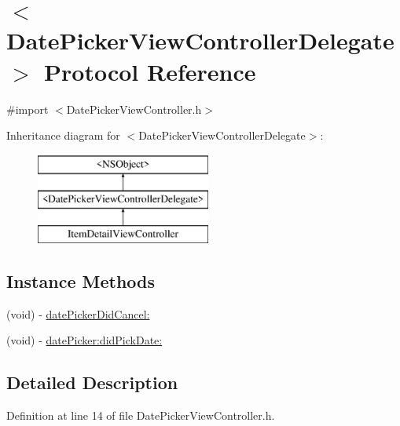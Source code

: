 \hypertarget{protocol_date_picker_view_controller_delegate-p}{\section{$<$Date\-Picker\-View\-Controller\-Delegate$>$ Protocol Reference}
\label{protocol_date_picker_view_controller_delegate-p}
}


{\ttfamily \#import $<$Date\-Picker\-View\-Controller.\-h$>$}

Inheritance diagram for $<$Date\-Picker\-View\-Controller\-Delegate$>$\-:\begin{figure}[H]
\begin{center}
\leavevmode
\includegraphics[height=3.000000cm]{protocol_date_picker_view_controller_delegate-p}
\end{center}
\end{figure}
\subsection*{Instance Methods}
\begin{DoxyCompactItemize}
\item 
(void) -\/ \hyperlink{protocol_date_picker_view_controller_delegate-p_a52a23b2da351b8099eec5e521c8879e1}{date\-Picker\-Did\-Cancel\-:}
\item 
(void) -\/ \hyperlink{protocol_date_picker_view_controller_delegate-p_a179d240efa595a6bb4a06287646f9680}{date\-Picker\-:did\-Pick\-Date\-:}
\end{DoxyCompactItemize}


\subsection{Detailed Description}


Definition at line 14 of file Date\-Picker\-View\-Controller.\-h.



